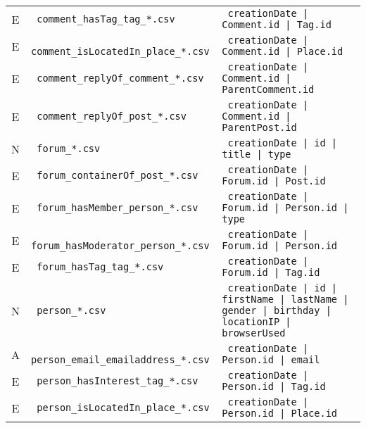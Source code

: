 \begin{table}[htb]
\begin{tabularx}{\linewidth}{|>{\sffamily}c|>{\tt}l|>{\tt}X|}
        E                    & comment\_hasTag\_tag\_*.csv             & creationDate | Comment.id | Tag.id                                                                \\
        E                    & comment\_isLocatedIn\_place\_*.csv      & creationDate | Comment.id | Place.id                                                              \\
        E                    & comment\_replyOf\_comment\_*.csv        & creationDate | Comment.id | ParentComment.id                                                      \\
        E                    & comment\_replyOf\_post\_*.csv           & creationDate | Comment.id | ParentPost.id                                                         \\
        \hline
        N                    & forum\_*.csv                            & creationDate | id | title | type                                                                  \\
        E                    & forum\_containerOf\_post\_*.csv         & creationDate | Forum.id | Post.id                                                                 \\
        E                    & forum\_hasMember\_person\_*.csv         & creationDate | Forum.id | Person.id | type                                                        \\
        E                    & forum\_hasModerator\_person\_*.csv      & creationDate | Forum.id | Person.id                                                               \\
        E                    & forum\_hasTag\_tag\_*.csv               & creationDate | Forum.id | Tag.id                                                                  \\
        \hline
        N                    & person\_*.csv                           & creationDate | id | firstName | lastName | gender | birthday | locationIP | browserUsed           \\
        A                    & person\_email\_emailaddress\_*.csv      & creationDate | Person.id | email                                                                  \\
        E                    & person\_hasInterest\_tag\_*.csv         & creationDate | Person.id | Tag.id                                                                 \\
        E                    & person\_isLocatedIn\_place\_*.csv       & creationDate | Person.id | Place.id                                                               \\

\end{tabularx}
\end{table}
